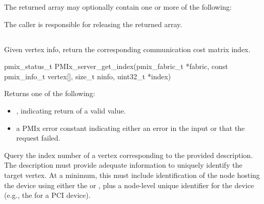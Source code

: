 \reqattrstart
{}
\reqattrend

The returned array may optionally contain one or more of the following:

\optattrstart
{}
\optattrend

The caller is responsible for releasing the returned array.



\subsection{}

\summary

Given vertex info, return the corresponding communication cost matrix index.

\format

\cspecificstart
\begin{codepar}
pmix_status_t
PMIx_server_get_index(pmix_fabric_t *fabric,
                      const pmix_info_t vertex[], size_t ninfo,
                      uint32_t *index)
\end{codepar}
\cspecificend

\begin{arglist}
\end{arglist}

Returns one of the following:

\begin{itemize}
    \item {}, indicating return of a valid value.
    \item a \ac{PMIx} error constant indicating either an error in the input or that the request failed.
\end{itemize}


\descr

Query the index number of a vertex corresponding to the provided description. The description must provide adequate information to uniquely identify the target vertex. At a minimum, this must include identification of the node hosting the device using either the  or , plus a node-level unique identifier for the device (e.g., the  for a \ac{PCI} device).


